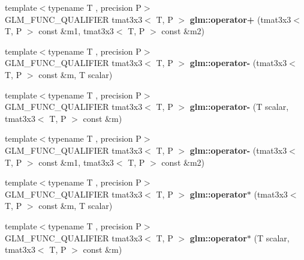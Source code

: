 \begin{DoxyCompactItemize}
{\footnotesize template$<$typename T , precision P$>$ }\\G\+L\+M\+\_\+\+F\+U\+N\+C\+\_\+\+Q\+U\+A\+L\+I\+F\+I\+ER tmat3x3$<$ T, P $>$ {\bfseries glm\+::operator+} (tmat3x3$<$ T, P $>$ const \&m1, tmat3x3$<$ T, P $>$ const \&m2)
\item 
\mbox{\label{type__mat3x3_8inl_a95cc6a86bd84683d8eb527067d65bdfe}} 
{\footnotesize template$<$typename T , precision P$>$ }\\G\+L\+M\+\_\+\+F\+U\+N\+C\+\_\+\+Q\+U\+A\+L\+I\+F\+I\+ER tmat3x3$<$ T, P $>$ {\bfseries glm\+::operator-\/} (tmat3x3$<$ T, P $>$ const \&m, T scalar)
\item 
\mbox{\label{type__mat3x3_8inl_aace121adce666d4a686f068de1833f3a}} 
{\footnotesize template$<$typename T , precision P$>$ }\\G\+L\+M\+\_\+\+F\+U\+N\+C\+\_\+\+Q\+U\+A\+L\+I\+F\+I\+ER tmat3x3$<$ T, P $>$ {\bfseries glm\+::operator-\/} (T scalar, tmat3x3$<$ T, P $>$ const \&m)
\item 
\mbox{\label{type__mat3x3_8inl_aca1e701a0f64422be768b08ce5891ae0}} 
{\footnotesize template$<$typename T , precision P$>$ }\\G\+L\+M\+\_\+\+F\+U\+N\+C\+\_\+\+Q\+U\+A\+L\+I\+F\+I\+ER tmat3x3$<$ T, P $>$ {\bfseries glm\+::operator-\/} (tmat3x3$<$ T, P $>$ const \&m1, tmat3x3$<$ T, P $>$ const \&m2)
\item 
\mbox{\label{type__mat3x3_8inl_a7c4414edd62adda20741e76bf3edf381}} 
{\footnotesize template$<$typename T , precision P$>$ }\\G\+L\+M\+\_\+\+F\+U\+N\+C\+\_\+\+Q\+U\+A\+L\+I\+F\+I\+ER tmat3x3$<$ T, P $>$ {\bfseries glm\+::operator$\ast$} (tmat3x3$<$ T, P $>$ const \&m, T scalar)
\item 
\mbox{\label{type__mat3x3_8inl_a077035bc318cd58318b0fb32e00d2683}} 
{\footnotesize template$<$typename T , precision P$>$ }\\G\+L\+M\+\_\+\+F\+U\+N\+C\+\_\+\+Q\+U\+A\+L\+I\+F\+I\+ER tmat3x3$<$ T, P $>$ {\bfseries glm\+::operator$\ast$} (T scalar, tmat3x3$<$ T, P $>$ const \&m)
\item 
\mbox{\label{type__mat3x3_8inl_a063060eed26a69cbc69ffd13b78263fd}} 

\end{DoxyCompactItemize}
